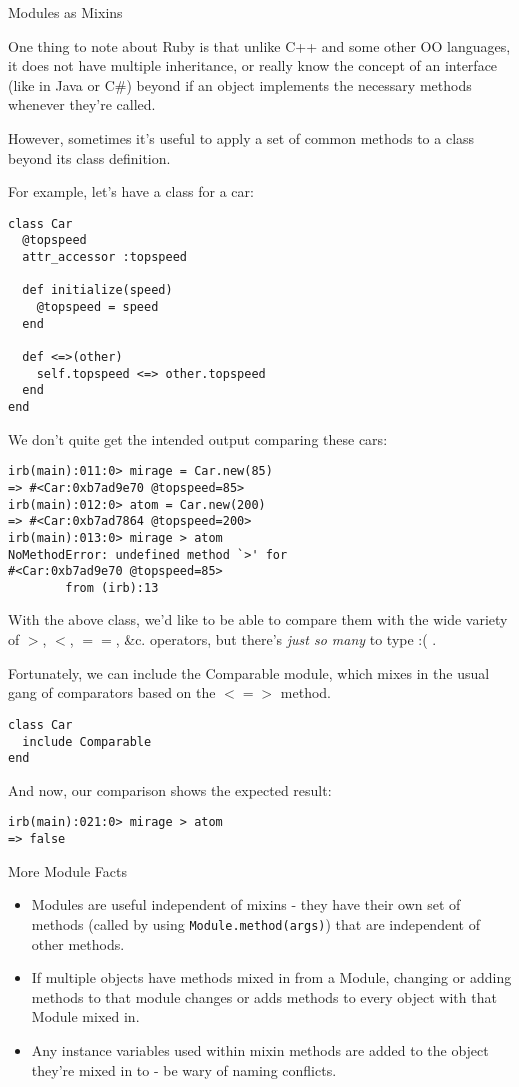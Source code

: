 \documentclass{slides}
\newcommand{\sh}[1]{
	{\Large #1}
	
}
\newcommand{\subh}[1]{
	{\large #1}
	
}
\begin{document}
\begin{slide}
\sh{Modules as Mixins}
One thing to note about Ruby is that unlike C++ and some other OO languages, it does not have multiple inheritance, or really know the concept of an interface (like in Java or C\#) beyond if an object implements the necessary methods whenever they're called.

However, sometimes it's useful to apply a set of common methods to a class beyond its class definition.

For example, let's have a class for a car:
\begin{verbatim}
class Car
  @topspeed
  attr_accessor :topspeed

  def initialize(speed)
    @topspeed = speed
  end
  
  def <=>(other)
    self.topspeed <=> other.topspeed
  end
end
\end{verbatim}
\end{slide}
\begin{slide}
We don't quite get the intended output comparing these cars:
\begin{verbatim}
irb(main):011:0> mirage = Car.new(85)
=> #<Car:0xb7ad9e70 @topspeed=85>
irb(main):012:0> atom = Car.new(200)
=> #<Car:0xb7ad7864 @topspeed=200>
irb(main):013:0> mirage > atom
NoMethodError: undefined method `>' for
#<Car:0xb7ad9e70 @topspeed=85>
        from (irb):13
\end{verbatim}

With the above class, we'd like to be able to compare them with the wide variety of $>$, $<$, $==$, \&c. operators, but there's {\em just so many} to type :( .

Fortunately, we can include the Comparable module, which mixes in the usual gang of comparators based on the $<=>$ method.

\begin{verbatim}
class Car
  include Comparable
end
\end{verbatim}
\end{slide}

\begin{slide}
And now, our comparison shows the expected result:
\begin{verbatim}
irb(main):021:0> mirage > atom
=> false
\end{verbatim}

\subh{More Module Facts}
\begin{itemize}
\item Modules are useful independent of mixins - they have their own set of methods (called by using \verb|Module.method(args)|) that are independent of other methods.
\item If multiple objects have methods mixed in from a Module, changing or adding methods to that module changes or adds methods to every object with that Module mixed in.
\item Any instance variables used within mixin methods are added to the object they're mixed in to - be wary of naming conflicts.
\end{itemize}
\end{slide}
\end{document}
